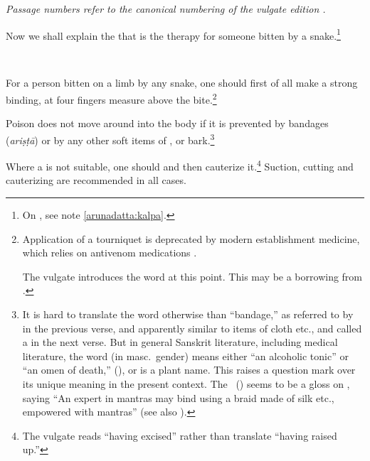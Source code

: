 \emph{Passage numbers refer to the canonical numbering of the vulgate edition  
\citep{vulgate}.
}
\begin{translation}
    \item [1]
    Now we shall explain the  that is the therapy for 
    someone bitten by a snake.\footnote{On , see note 
    \ref{arunadatta:kalpa}.}
    
    \item [2]  \ \cbdelete 
       
    \item[3] For a person bitten on a limb by any snake, one should first
of all make a strong binding, at four fingers measure above the
bite.\footnote{Application of a tourniquet is deprecated by modern
    establishment medicine, which relies on antivenom medications
    \citep[e.g.,][150--151 et passim in the literature]{pill-2013}.
    
    The vulgate introduces the word  at this point.  This may be a 
    borrowing from .}
    
    
    \item[4]
    
    Poison does not move around into the body if it is prevented by
bandages (\emph{ariṣṭā}) or by any other soft
items of ,  or
bark.\footnote{It is hard to translate the word 
    otherwise than “bandage,” as referred to by  in the
    previous verse, and apparently similar to items of cloth etc., and
    called a  in the next verse.  But in general Sanskrit
    literature, including medical literature, the word (in masc.\ gender)
    means either “an alcoholic tonic” or “an omen of death,”
    (), or is a plant name.  This raises a question mark
    over its unique meaning in the present context.  The \AH\
    () seems to be a gloss on , saying
    “An expert in mantras may bind using a braid made of silk etc.,
    empowered with mantras” (see also \Su{5.5.8}{575}).}
    
\item[5] Where a  is not suitable, one should
\diff{raise the bite up} and then cauterize it.\footnote{The vulgate
    reads \dev{utkṛtya} “having excised” rather than translate 
    “having raised up.”} Suction, cutting and cauterizing are recommended in
    all cases.


\end{translation}
